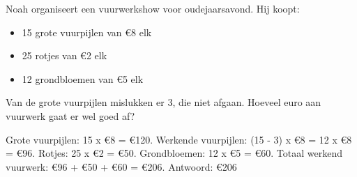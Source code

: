 \begin{opgave}
Noah organiseert een vuurwerkshow voor oudejaarsavond. Hij koopt:

\begin{itemize}
\item 15 grote vuurpijlen van €8 elk
\item 25 rotjes van €2 elk
\item 12 grondbloemen van €5 elk
\end{itemize}

Van de grote vuurpijlen mislukken er 3, die niet afgaan. Hoeveel euro aan vuurwerk gaat er wel goed af?
\end{opgave}

\begin{oplossing}
Grote vuurpijlen: 15 x €8 = €120.
Werkende vuurpijlen: (15 - 3) x €8 = 12 x €8 = €96.
Rotjes: 25 x €2 = €50.
Grondbloemen: 12 x €5 = €60.
Totaal werkend vuurwerk: €96 + €50 + €60 = €206.
Antwoord: €206
\end{oplossing}